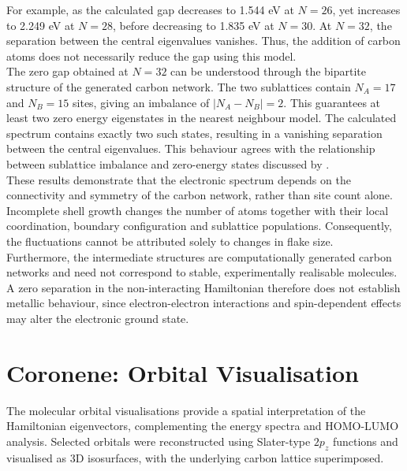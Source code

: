 \noindent For example, as the calculated gap decreases to 1.544 eV at $N=26$, yet increases to 2.249 eV at $N=28$, before decreasing to 1.835 eV at $N=30$. At $N=32$, the separation between the central eigenvalues vanishes. Thus, the addition of carbon atoms does not necessarily reduce the gap using this model. \\

\noindent The zero gap obtained at $N=32$ can be understood through the bipartite structure of the generated carbon network. The two sublattices contain $N_A=17$ and $N_B=15$ sites, giving an imbalance of $|N_A-N_B|=2$.  This guarantees at least two zero energy eigenstates in the nearest neighbour model. The calculated spectrum contains exactly two such states, resulting in a vanishing separation between the central eigenvalues. This behaviour agrees with the relationship between sublattice imbalance and zero-energy states discussed by \textcite{fernandez-rossier_magnetism_2007}. \\

\noindent These results demonstrate that the electronic spectrum depends on the connectivity and symmetry of the carbon network, rather than site count alone. Incomplete shell growth changes the number of atoms together with their local coordination, boundary configuration and sublattice populations. Consequently, the fluctuations cannot be attributed solely to changes in flake size. \\

\noindent Furthermore, the intermediate structures are computationally generated carbon networks and need not correspond to stable, experimentally realisable molecules. A zero separation in the non-interacting Hamiltonian therefore does not establish metallic behaviour, since electron-electron interactions and spin-dependent effects may alter the electronic ground state.


\section{Coronene: Orbital Visualisation}
\label{sec:results_orbitals}

The molecular orbital visualisations provide a spatial interpretation of the Hamiltonian eigenvectors, complementing the energy spectra and HOMO-LUMO analysis. Selected orbitals were reconstructed using Slater-type $2p_z$ functions and visualised as 3D isosurfaces, with the underlying carbon lattice superimposed. \\

